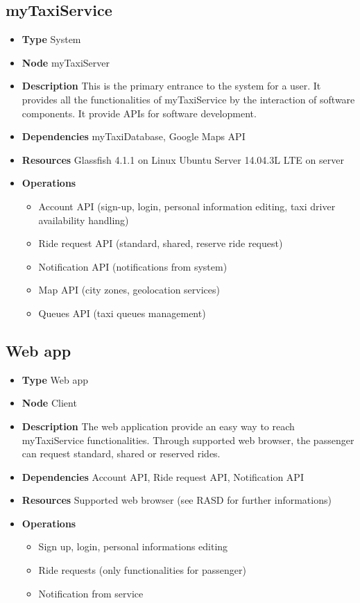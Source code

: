 \subsection{myTaxiService}
\begin{itemize}
	\item[]\textbf{Type} System
	\item[]\textbf{Node} myTaxiServer
	\item[]\textbf{Description} This is the primary entrance to the system for a user. It provides all the functionalities of myTaxiService by the interaction of software components. It provide APIs for software development.
	\item[]\textbf{Dependencies} myTaxiDatabase, Google Maps API
	\item[]\textbf{Resources} Glassfish 4.1.1 on Linux Ubuntu Server 14.04.3L LTE on server
	\item[]\textbf{Operations}\begin{itemize}
		\item Account API (sign-up, login, personal information editing, taxi driver availability handling)
		\item Ride request API (standard, shared, reserve ride request)
		\item Notification API (notifications from system)
		\item Map API (city zones, geolocation services)
		\item Queues API (taxi queues management)
	\end{itemize}
\end{itemize}

\subsection{Web app}
\begin{itemize}
	\item[]\textbf{Type} Web app
	\item[]\textbf{Node} Client
	\item[]\textbf{Description} The web application provide an easy way to reach myTaxiService functionalities. Through supported web browser, the passenger can request standard, shared or reserved rides.
	\item[]\textbf{Dependencies} Account API, Ride request API, Notification API
	\item[]\textbf{Resources} Supported web browser (see RASD for further informations)
	\item[]\textbf{Operations}\begin{itemize}
		\item Sign up, login, personal informations editing
		\item Ride requests (only functionalities for passenger)
		\item Notification from service
	\end{itemize}
\end{itemize}

